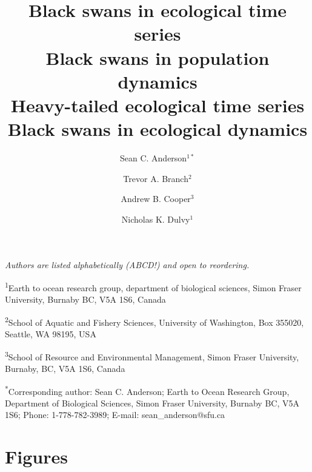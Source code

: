 \documentclass[12pt]{article}
\title{Black swans in ecological time series\\Black swans in population dynamics\\Heavy-tailed ecological time series\\Black swans in ecological dynamics}
\author{
Sean C. Anderson$^{1\ast}$ \and
Trevor A. Branch$^2$ \and
Andrew B. Cooper$^3$ \and
Nicholas K. Dulvy$^1$
}
\date{}
\begin{document}
\maketitle


\emph{Authors are listed alphabetically (ABCD!) and open to reordering.}

\textsuperscript{1}Earth to ocean research group, department of biological sciences, Simon Fraser University, Burnaby BC, V5A 1S6, Canada

\textsuperscript{2}School of Aquatic and Fishery Sciences, University of Washington, Box 355020, Seattle, WA 98195, USA

\textsuperscript{3}School of Resource and Environmental Management, Simon Fraser University, Burnaby, BC, V5A 1S6, Canada

\textsuperscript{*}Corresponding author: Sean C. Anderson; Earth to Ocean Research Group, Department of Biological Sciences, Simon Fraser University, Burnaby BC, V5A 1S6; Phone: 1-778-782-3989; E-mail: sean\_anderson@sfu.ca

\doublespacing

\thispagestyle{empty}

\linenumbers



\clearpage
\section{Figures}





\renewcommand{\thetable}{S\arabic{table}}
\setcounter{table}{0}




\end{document}
